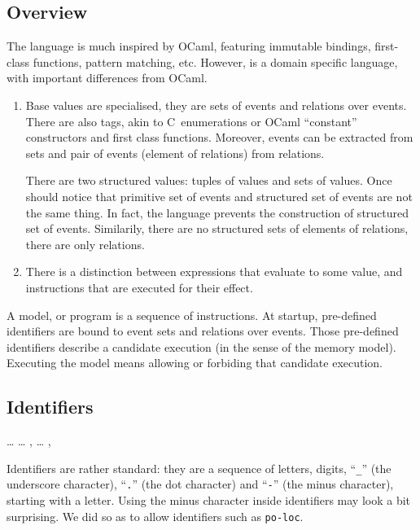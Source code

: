 \subsection{\label{overview}Overview}
The \cat{} language is much inspired by OCaml, featuring immutable bindings,
first-class functions, pattern matching, etc.
However, \cat{} is a domain specific language, with important differences
from OCaml.
\begin{enumerate}
\item
Base values are specialised, they are sets of events and relations
over events. There are also tags, akin to C~enumerations or OCaml
``constant'' constructors and first class functions. Moreover, events
can be extracted from sets and pair of events (element of relations)
from relations.

There are two structured values: tuples of values and sets of values.
Once should notice that primitive set of events and structured set of events are not the same
thing. In fact, the language prevents the construction of structured set of events.
Similarily, there are no structured sets of elements of relations, there are only relations.

\item There is a distinction between expressions that evaluate
to some value, and instructions that are executed for their effect.
\end{enumerate}
A model, or \cat{} program is a sequence of instructions.
At startup, pre-defined identifiers are bound to event sets and relations
over events.
Those pre-defined identifiers describe a candidate execution
(in the sense of the memory model).
Executing the model means allowing or forbiding that candidate
execution.


\subsection{\label{language:identifier}Identifiers}
\begin{syntax}
 \is {} \ldots{}
\orelse  {} \ldots{}
\sep
{} \is {} \ldots{}
\sep
{} \is {} \brepet{}  \orelse {}
\orelse \T{\_} \orelse {} \orelse \T{-} \erepet
\end{syntax}
Identifiers are rather standard: they are a sequence of letters, digits,
``\texttt{\_}'' (the underscore character), ``\texttt{.}'' (the dot character)
and ``\texttt{-}'' (the minus character),
starting with a letter.
Using the minus character inside identifiers  may look a bit surprising.
We did so as to allow identifiers such as \texttt{po-loc}.

